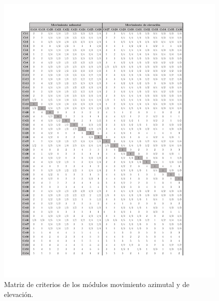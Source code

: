 \newpage
\begin{figure}[H]
\centering
	\includegraphics[width=16cm]{imagenes/MNormal2Ex}
	\caption{Matriz de criterios de los módulos movimiento azimutal y de elevación.}
	\label{fig:MNormal2Ex}
\end{figure}


